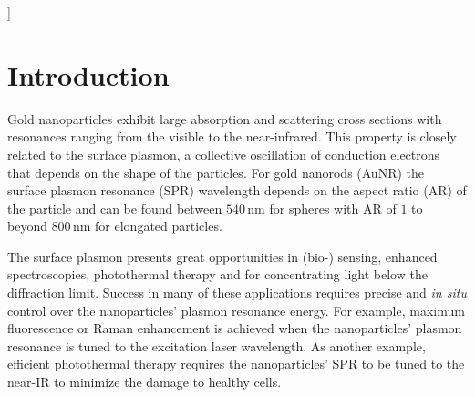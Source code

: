 \documentclass[twoside,twocolumn,11pt]{article}
\newcommand{\nm}{\ensuremath{\,\textrm{nm}}}
\begin{document}
  ]

\renewcommand*\rmdefault{bch}\normalfont\upshape
\rmfamily
\section*{}
\vspace{-1cm}






\section{Introduction}

Gold nanoparticles exhibit large absorption and scattering cross sections
with resonances ranging from the visible to the near-infrared. This property is
closely related to the surface plasmon, a collective oscillation of conduction
electrons that depends on the shape of the particles. For gold nanorods (AuNR)
the surface plasmon resonance (SPR) wavelength depends on the aspect ratio (AR)
of the particle and can be found between $540\nm$ for spheres with AR of $1$ to
beyond $800\nm$ for elongated particles.

The surface plasmon presents great opportunities in (bio-)
sensing\cite{Zijlstra2012}, enhanced spectroscopies\cite{Sivapalan2013},
photothermal therapy\cite{Zhao2014} and for concentrating light below the
diffraction limit\cite{Zijlstra2011}. Success in many of these applications
requires precise and \textit{in situ} control over the nanoparticles' plasmon
resonance energy. For example, maximum fluorescence\cite{Khatua2014} or Raman
enhancement\cite{McFarland2005} is achieved when the nanoparticles' plasmon
resonance is tuned to the excitation laser wavelength. As another example, efficient photothermal
therapy requires the nanoparticles' SPR to be tuned to the near-IR to minimize
the damage to healthy cells\cite{Alkilany2012}.
\end{document}
